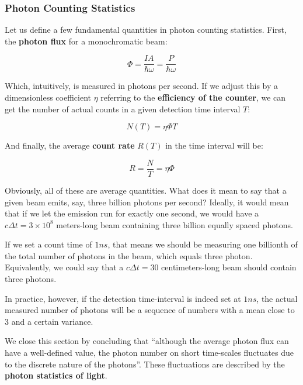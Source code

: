 \documentclass[12pt,a4paper]{report}
\begin{document}
\subsubsection{Photon Counting Statistics}

Let us define a few fundamental quantities in photon counting statistics. First, the \textbf{photon flux} for a monochromatic beam:

\begin{equation}
    \Phi=\frac{IA}{\hbar \omega}=\frac{P}{\hbar \omega}
\end{equation}

Which, intuitively, is measured in photons per second. If we adjust this by a dimensionless coefficient $\eta$ referring to the \textbf{efficiency of the counter}, we can get the number of actual counts in a given detection time interval $T$:

\begin{equation}
    N(T)=\eta\Phi T
\end{equation}

And finally, the average \textbf{count rate} $R(T)$ in the time interval will be:

\begin{equation}
    R=\frac{N}{T}=\eta\Phi
\end{equation}

Obviously, all of these are average quantities. What does it mean to say that a given beam emits, say, three billion photons per second? Ideally, it would mean that if we let the emission run for exactly one second, we would have a $c \Delta t=3\times10^8$ meters-long beam containing three billion equally spaced photons.

If we set a count time of $1 ns$, that means we should be measuring one billionth of the total number of photons in the beam, which equals three photon. Equivalently, we could say that a $c \Delta t=30$ centimeters-long beam should contain three photons.

In practice, however, if the detection time-interval is indeed set at $1 ns$, the actual measured number of photons will be a sequence of numbers with a mean close to $3$ and a certain variance.

We close this section by concluding that ``although the average photon flux can have a well-defined value, the photon number on short time-scales fluctuates due to the discrete nature of the photons''. These fluctuations are described by the \textbf{photon statistics of light}.
\end{document}
